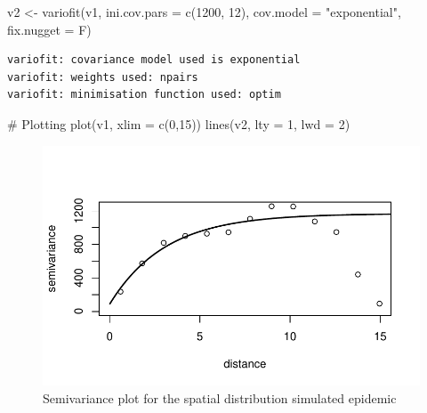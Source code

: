 \documentclass[
  letterpaper,
  DIV=11,
  numbers=noendperiod]{scrreprt}
\newenvironment{Shaded}{\begin{snugshade}}{\end{snugshade}}
\newcommand{\AttributeTok}[1]{\textcolor[rgb]{0.40,0.45,0.13}{#1}}
\newcommand{\CommentTok}[1]{\textcolor[rgb]{0.37,0.37,0.37}{#1}}
\newcommand{\DecValTok}[1]{\textcolor[rgb]{0.68,0.00,0.00}{#1}}
\newcommand{\FunctionTok}[1]{\textcolor[rgb]{0.28,0.35,0.67}{#1}}
\newcommand{\NormalTok}[1]{\textcolor[rgb]{0.00,0.23,0.31}{#1}}
\newcommand{\OtherTok}[1]{\textcolor[rgb]{0.00,0.23,0.31}{#1}}
\newcommand{\StringTok}[1]{\textcolor[rgb]{0.13,0.47,0.30}{#1}}
\begin{document}
\begin{Shaded}
\begin{Highlighting}[]
\NormalTok{v2 }\OtherTok{\textless{}{-}} \FunctionTok{variofit}\NormalTok{(v1, }\AttributeTok{ini.cov.pars =} \FunctionTok{c}\NormalTok{(}\DecValTok{1200}\NormalTok{, }\DecValTok{12}\NormalTok{), }
               \AttributeTok{cov.model =} \StringTok{"exponential"}\NormalTok{, }
               \AttributeTok{fix.nugget =}\NormalTok{ F)}
\end{Highlighting}
\end{Shaded}

\begin{verbatim}
variofit: covariance model used is exponential 
variofit: weights used: npairs 
variofit: minimisation function used: optim 
\end{verbatim}

\begin{Shaded}
\begin{Highlighting}[]
\CommentTok{\# Plotting }
\FunctionTok{plot}\NormalTok{(v1, }\AttributeTok{xlim =} \FunctionTok{c}\NormalTok{(}\DecValTok{0}\NormalTok{,}\DecValTok{15}\NormalTok{))}
\FunctionTok{lines}\NormalTok{(v2, }\AttributeTok{lty =} \DecValTok{1}\NormalTok{, }\AttributeTok{lwd =} \DecValTok{2}\NormalTok{)}
\end{Highlighting}
\end{Shaded}

\begin{figure}[H]

{\centering \includegraphics{spatial-tests_files/figure-pdf/fig-semivariance-1.pdf}

}

\caption{\label{fig-semivariance}Semivariance plot for the spatial
distribution simulated epidemic}

\end{figure}
\end{document}
